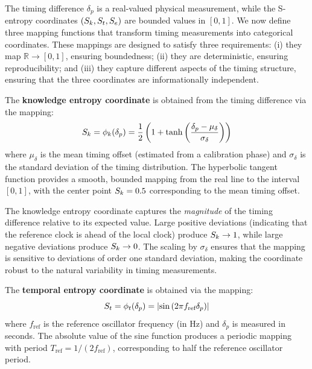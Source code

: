 The timing difference $\delta_p$ is a real-valued physical measurement, while the S-entropy coordinates $(S_k, S_t, S_e)$ are bounded values in $[0,1]$. We now define three mapping functions that transform timing measurements into categorical coordinates. These mappings are designed to satisfy three requirements: (i) they map $\mathbb{R} \to [0,1]$, ensuring boundedness; (ii) they are deterministic, ensuring reproducibility; and (iii) they capture different aspects of the timing structure, ensuring that the three coordinates are informationally independent.

\begin{definition}
\label{def:phi_k}
The \textbf{knowledge entropy coordinate} is obtained from the timing difference via the mapping:
\begin{equation}
S_k = \phi_k(\delta_p) = \frac{1}{2}\left(1 + \tanh\left(\frac{\delta_p - \mu_\delta}{\sigma_\delta}\right)\right)
\label{eq:phi_k}
\end{equation}
where $\mu_\delta$ is the mean timing offset (estimated from a calibration phase) and $\sigma_\delta$ is the standard deviation of the timing distribution. The hyperbolic tangent function provides a smooth, bounded mapping from the real line to the interval $[0,1]$, with the center point $S_k = 0.5$ corresponding to the mean timing offset.
\end{definition}

The knowledge entropy coordinate captures the \textit{magnitude} of the timing difference relative to its expected value. Large positive deviations (indicating that the reference clock is ahead of the local clock) produce $S_k \to 1$, while large negative deviations produce $S_k \to 0$. The scaling by $\sigma_\delta$ ensures that the mapping is sensitive to deviations of order one standard deviation, making the coordinate robust to the natural variability in timing measurements.

\begin{definition}
\label{def:phi_t}
The \textbf{temporal entropy coordinate} is obtained via the mapping:
\begin{equation}
S_t = \phi_t(\delta_p) = \left| \sin\left( 2\pi f_{\text{ref}} \delta_p \right) \right|
\label{eq:phi_t}
\end{equation}
where $f_{\text{ref}}$ is the reference oscillator frequency (in Hz) and $\delta_p$ is measured in seconds. The absolute value of the sine function produces a periodic mapping with period $T_{\text{ref}} = 1/(2f_{\text{ref}})$, corresponding to half the reference oscillator period.
\end{definition}

